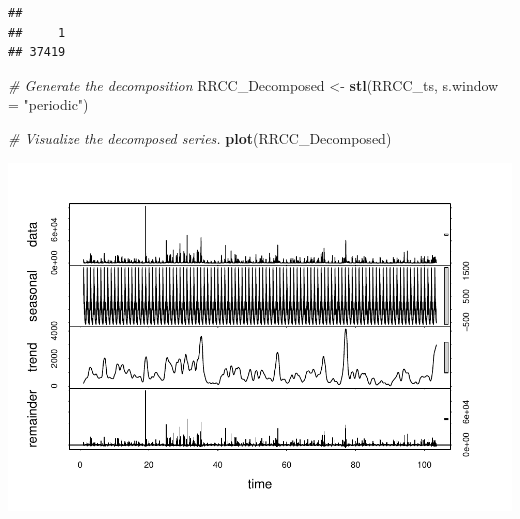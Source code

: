 \documentclass[12pt,]{article}
\newenvironment{Shaded}{\begin{snugshade}}{\end{snugshade}}
\newcommand{\CommentTok}[1]{\textcolor[rgb]{0.56,0.35,0.01}{\textit{#1}}}
\newcommand{\DataTypeTok}[1]{\textcolor[rgb]{0.13,0.29,0.53}{#1}}
\newcommand{\DecValTok}[1]{\textcolor[rgb]{0.00,0.00,0.81}{#1}}
\newcommand{\KeywordTok}[1]{\textcolor[rgb]{0.13,0.29,0.53}{\textbf{#1}}}
\newcommand{\NormalTok}[1]{#1}
\newcommand{\OperatorTok}[1]{\textcolor[rgb]{0.81,0.36,0.00}{\textbf{#1}}}
\newcommand{\StringTok}[1]{\textcolor[rgb]{0.31,0.60,0.02}{#1}}
\begin{document}
\begin{Shaded}
\end{Shaded}

\begin{verbatim}
## 
##     1 
## 37419
\end{verbatim}

\begin{Shaded}
\begin{Highlighting}[]
\CommentTok{# Generate the decomposition}
\NormalTok{RRCC_Decomposed <-}\StringTok{ }\KeywordTok{stl}\NormalTok{(RRCC_ts, }\DataTypeTok{s.window =} \StringTok{"periodic"}\NormalTok{)}

\CommentTok{# Visualize the decomposed series. }
\KeywordTok{plot}\NormalTok{(RRCC_Decomposed)}
\end{Highlighting}
\end{Shaded}

\includegraphics{Project_Template_files/figure-latex/unnamed-chunk-6-20.pdf}
\end{document}
